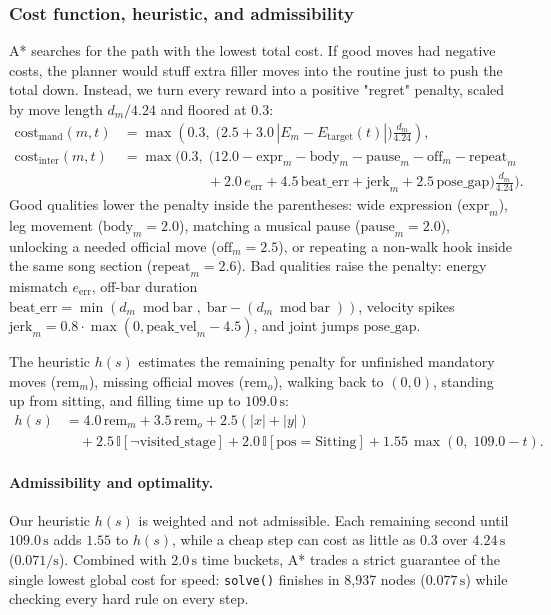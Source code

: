 \documentclass[11pt,a4paper]{article}
\newcommand{\code}[1]{\texttt{#1}}
\begin{document}
\subsubsection{Cost function, heuristic, and admissibility}
A* searches for the path with the lowest total cost. If good moves had negative costs, the planner would stuff extra filler moves into the routine just to push the total down. Instead, we turn every reward into a positive "regret" penalty, scaled by move length $d_m / 4.24$ and floored at $0.3$:
\begin{align*}
  \text{cost}_{\text{mand}}(m, t) &= \max\!\left(0.3,\; \Big(2.5 + 3.0\,|E_m - E_{\text{target}}(t)|\Big)\frac{d_m}{4.24}\right), \\
  \text{cost}_{\text{inter}}(m, t) &= \max\!\Big(0.3,\; \big(12.0 - \text{expr}_m - \text{body}_m - \text{pause}_m - \text{off}_m - \text{repeat}_m \\
  &\qquad\qquad\qquad {} + 2.0\,e_{\text{err}} + 4.5\,\text{beat\_err} + \text{jerk}_m + 2.5\,\text{pose\_gap}\big)\frac{d_m}{4.24}\Big).
\end{align*}
Good qualities lower the penalty inside the parentheses: wide expression ($\text{expr}_m$), leg movement ($\text{body}_m = 2.0$), matching a musical pause ($\text{pause}_m = 2.0$), unlocking a needed official move ($\text{off}_m = 2.5$), or repeating a non-walk hook inside the same song section ($\text{repeat}_m = 2.6$). Bad qualities raise the penalty: energy mismatch $e_{\text{err}}$, off-bar duration $\text{beat\_err} = \min(d_m \bmod \text{bar},\; \text{bar} - (d_m \bmod \text{bar}))$, velocity spikes $\text{jerk}_m = 0.8 \cdot \max(0, \text{peak\_vel}_m - 4.5)$, and joint jumps $\text{pose\_gap}$.

The heuristic $h(s)$ estimates the remaining penalty for unfinished mandatory moves ($\text{rem}_m$), missing official moves ($\text{rem}_o$), walking back to $(0,0)$, standing up from sitting, and filling time up to $109.0\,\text{s}$:
\begin{align*}
  h(s) &= 4.0\,\text{rem}_m + 3.5\,\text{rem}_o + 2.5(|x| + |y|) \\
       &\quad {} + 2.5\,\mathbb{I}[\neg\text{visited\_stage}] + 2.0\,\mathbb{I}[\text{pos} = \text{Sitting}] + 1.55\,\max(0,\; 109.0 - t).
\end{align*}

\paragraph{Admissibility and optimality.}
Our heuristic $h(s)$ is weighted and not admissible. Each remaining second until $109.0\,\text{s}$ adds $1.55$ to $h(s)$, while a cheap step can cost as little as $0.3$ over $4.24\,\text{s}$ ($0.071/\text{s}$). Combined with $2.0\,\text{s}$ time buckets, A* trades a strict guarantee of the single lowest global cost for speed: \code{solve()} finishes in 8,937 nodes ($0.077\,\text{s}$) while checking every hard rule on every step.
\end{document}
